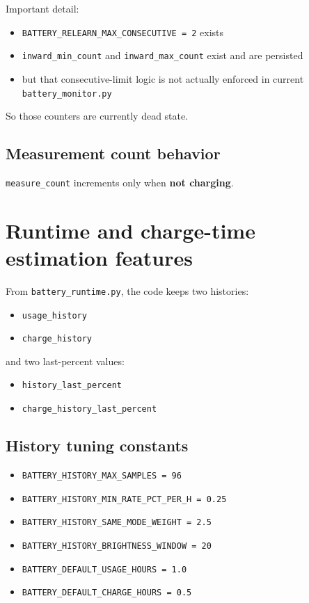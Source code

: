 \documentclass[11pt]{article}
\begin{document}
Important detail:
\begin{itemize}
  \item \texttt{BATTERY\_RELEARN\_MAX\_CONSECUTIVE = 2} exists
  \item \texttt{inward\_min\_count} and \texttt{inward\_max\_count} exist and are persisted
  \item but that consecutive-limit logic is not actually enforced in current \texttt{battery\_monitor.py}
\end{itemize}

So those counters are currently dead state.

\subsection{Measurement count behavior}
\texttt{measure\_count} increments only when \textbf{not charging}.

\section{Runtime and charge-time estimation features}
From \texttt{battery\_runtime.py}, the code keeps two histories:
\begin{itemize}
  \item \texttt{usage\_history}
  \item \texttt{charge\_history}
\end{itemize}

and two last-percent values:
\begin{itemize}
  \item \texttt{history\_last\_percent}
  \item \texttt{charge\_history\_last\_percent}
\end{itemize}

\subsection{History tuning constants}
\begin{itemize}
  \item \texttt{BATTERY\_HISTORY\_MAX\_SAMPLES = 96}
  \item \texttt{BATTERY\_HISTORY\_MIN\_RATE\_PCT\_PER\_H = 0.25}
  \item \texttt{BATTERY\_HISTORY\_SAME\_MODE\_WEIGHT = 2.5}
  \item \texttt{BATTERY\_HISTORY\_BRIGHTNESS\_WINDOW = 20}
  \item \texttt{BATTERY\_DEFAULT\_USAGE\_HOURS = 1.0}
  \item \texttt{BATTERY\_DEFAULT\_CHARGE\_HOURS = 0.5}
\end{itemize}
\end{document}
